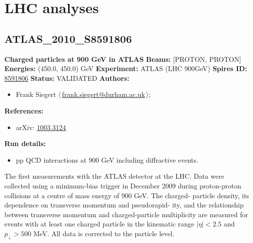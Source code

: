 \section{LHC analyses}\subsection[ATLAS\_2010\_S8591806]{ATLAS\_2010\_S8591806\,\cite{Aad:2010rd}}
\textbf{Charged particles at 900 GeV in ATLAS}\newline
\textbf{Beams:} [PROTON, PROTON] \newline
\textbf{Energies:} (450.0, 450.0) GeV \newline
\textbf{Experiment:} ATLAS (LHC 900GeV) \newline
\textbf{Spires ID:} \href{http://www.slac.stanford.edu/spires/find/hep/www?rawcmd=key+8591806}{8591806}\newline
\textbf{Status:} VALIDATED\newline
\textbf{Authors:}
\begin{itemize}
  \item Frank Siegert $\langle\,$\href{mailto:frank.siegert@durham.ac.uk}{frank.siegert@durham.ac.uk}$\,\rangle$;
\end{itemize}
\textbf{References:}
\begin{itemize}
  \item arXiv: \href{http://arxiv.org/abs/1003.3124}{1003.3124}
\end{itemize}
\textbf{Run details:}
\begin{itemize}

  \item pp QCD interactions at 900 GeV including diffractive events.\end{itemize}

\noindent The ﬁrst measurements with the ATLAS detector at the LHC. Data were collected using a minimum-bias trigger in December 2009 during proton-proton collisions at a centre of mass energy of 900 GeV. The charged- particle density, its dependence on transverse momentum and pseudorapid- ity, and the relationship between transverse momentum and charged-particle multiplicity are measured for events with at least one charged particle in the kinematic range $|\eta| < 2.5$ and $p_\perp > 500$ MeV. All data is corrected to the particle level.

\clearpage


